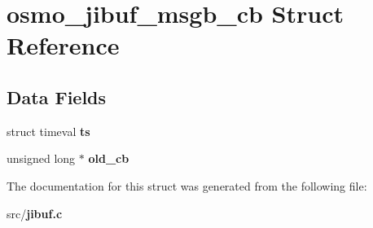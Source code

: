 \section{osmo\+\_\+jibuf\+\_\+msgb\+\_\+cb Struct Reference}
\label{structosmo__jibuf__msgb__cb}
\subsection*{Data Fields}
\begin{DoxyCompactItemize}
\item 
struct timeval {\bfseries ts}\label{structosmo__jibuf__msgb__cb_a0030f8093b8532e14b10221d60383bc5}

\item 
unsigned long $\ast$ {\bfseries old\+\_\+cb}\label{structosmo__jibuf__msgb__cb_afd68dae90ec0b4a1ad01a674f155d4e2}

\end{DoxyCompactItemize}


The documentation for this struct was generated from the following file\+:\begin{DoxyCompactItemize}
\item 
src/{\bf jibuf.\+c}\end{DoxyCompactItemize}
